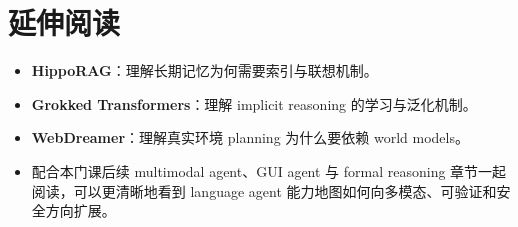 \section{延伸阅读}

\begin{itemize}
\item \textbf{HippoRAG}：理解长期记忆为何需要索引与联想机制。
\item \textbf{Grokked Transformers}：理解 implicit reasoning 的学习与泛化机制。
\item \textbf{WebDreamer}：理解真实环境 planning 为什么要依赖 world models。
\item 配合本门课后续 multimodal agent、GUI agent 与 formal reasoning 章节一起阅读，可以更清晰地看到 language agent 能力地图如何向多模态、可验证和安全方向扩展。
\end{itemize}
